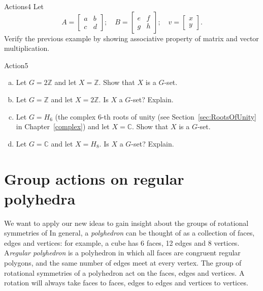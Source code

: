 \begin {exercise}{Actions4}
Let
\begin{equation*}
A=\left[\begin {array}{cc}
a&b\\c&d\end{array}\right]; \quad 
B=\left[\begin{array}{cc} e& f\\ g & h\end{array}\right]; \quad 
v=\left[\begin{array}{c}x\\ y\end{array}\right].
\end{equation*}
Verify the previous example by showing associative property of matrix and vector multiplication. 
\end {exercise}

\begin{exercise}{Action5}
\begin{enumerate}[(a)]
\item 
Let $G = 2\mathbb{Z}$ and let $X =\mathbb{Z}$. Show that $X$ is a $G$-set.
\item Let $G = \mathbb{Z}$ and let $X = 2\mathbb{Z}$. Is $X$ a $G$-set? Explain.
\item Let $G = H_6$ (the complex $6$-th roots of unity (see Section~\ref{sec:RootsOfUnity} in Chapter~\ref{complex}) and let $X =\mathbb{C}$. Show that $X$ is a $G$-set.
\item Let $G = \mathbb{C}$ and let $X = H_8$.  Is $X$ a $G$-set? Explain.
\end{enumerate}
\end{exercise}
\section{Group actions on regular polyhedra}\label{ActionsOnPolyhedra}
We want to apply our new ideas to gain insight about the groups of rotational symmetries of   In general, a \emph{polyhedron} can be thought of as a collection of faces, edges and vertices: for example, a cube has 6 faces, 12 edges and 8 vertices. A\emph{regular polyhedron} is a polyhedron in which all faces are congruent regular polygons, and the same number of edges meet at every vertex. The group of rotational symmetries of a polyhedron act on the faces, edges and vertices.  A rotation will always take faces to faces, edges to edges and vertices to vertices. 

